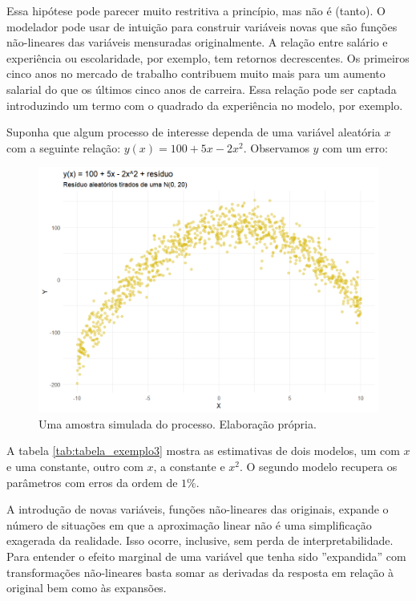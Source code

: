 Essa hipótese pode parecer muito restritiva a princípio, mas não é (tanto). O modelador pode usar de intuição para construir variáveis novas que são funções não-lineares das variáveis mensuradas originalmente. A relação entre salário e experiência ou escolaridade, por exemplo, tem retornos decrescentes. Os primeiros cinco anos no mercado de trabalho contribuem muito mais para um aumento salarial do que os últimos cinco anos de carreira. Essa relação pode ser captada introduzindo um termo com o quadrado da experiência no modelo, por exemplo. 

\begin{exemplo}

Suponha que algum processo de interesse dependa de uma variável aleatória $x$ com a seguinte relação: $y(x) = 100 + 5x - 2x^2$. Observamos $y$ com um erro:

\begin{figure}[H]
    \centering
    \includegraphics[scale = .60]{imagens/exemplo3_dist.png}
    \caption{Uma amostra simulada do processo. Elaboração própria.}
\end{figure}

A tabela \ref{tab:tabela_exemplo3} mostra as estimativas de dois modelos, um com $x$ e uma constante, outro com $x$, a constante e $x^2$. O segundo modelo recupera os parâmetros com erros da ordem de $1\%$. 

\label{tab:tabela_exemplo3}

A introdução de novas variáveis, funções não-lineares das originais, expande o número de situações em que a aproximação linear não é uma simplificação exagerada da realidade. Isso ocorre, inclusive, sem perda de interpretabilidade. Para entender o efeito marginal de uma variável que tenha sido ''expandida'' com transformações não-lineares basta somar as derivadas da resposta em relação à original bem como às expansões.


\end{exemplo}

